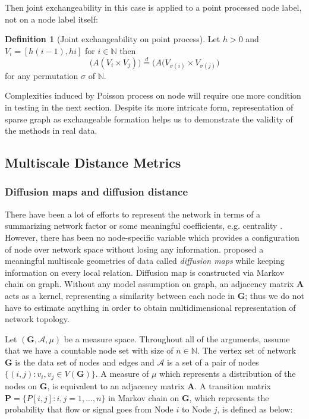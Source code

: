 \documentclass[12pt]{article}
\theoremstyle{definition}
\newtheorem{definition}{Definition}[section]
\begin{document}
Then joint exchangeability in this case is applied to a point processed node label, not on a node label itself:
\begin{definition}[Joint exchangeability on point process]
	\label{point}
	Let $h > 0$ and  $V_{i} = [h(i-1), hi ]$ for $i \in \mathbb{N}$ then
	\begin{equation}
	\big( A( V_{i} \times V_{j}  )   \big)  \stackrel{d}{=} \big( A( V_{\sigma(i)} \times V_{\sigma(j)}     \big)
	\end{equation}	
	for any permutation $\sigma$ of $\mathbb{N}$.		
\end{definition}
Complexities induced by Poisson process on node will require one more condition in testing in the next section. Despite its more intricate form, representation of sparse graph as exchangeable formation helps us to demonstrate the validity of the methods in real data.

\subsection{Multiscale Distance Metrics}	


\subsubsection{Diffusion maps and diffusion distance}	
There have been a lot of efforts to represent the network in terms of a summarizing network factor \citep{hoff2002latent} or some meaningful coefficients, e.g. centrality \citep{mantzaris2013dynamic, sporns2007identification}. However, there has been no node-specific variable which provides a configuration of node over network space without losing any information. \cite{coifman2006diffusion} proposed a meaningful multiscale geometries of data called \textit{diffusion maps} while keeping information on every local relation. Diffusion map is constructed via Markov chain on graph. Without any model assumption on graph, an adjacency matrix $\boldsymbol{A}$ acts as a kernel, representing a similarity between each node in $\boldsymbol{G}$; thus we do not have to estimate anything in order to obtain multidimensional representation of network topology. 
	
Let $(\boldsymbol{G}, \mathcal{A}, \mu)$ be a measure space. Throughout all of the arguments, assume that we have a countable node set with size of $n \in \mathbb{N}$. The vertex set of network $\boldsymbol{G}$ is the data set of nodes and edges and $\mathcal{A}$ is a set of a pair of nodes $\{(i,j) : v_{i}, v_{j} \in V(\boldsymbol{G}) \}$. A measure of $\mu$ which represents a distribution of the nodes on $\boldsymbol{G}$, is equivalent to an adjacency matrix $\boldsymbol{A}$. A transition matrix $\mathbf{P} = \{P[i,j] : i,j=1,...,n \}$ in Markov chain on $\boldsymbol{G}$, which represents the probability that flow or signal goes from Node $i$ to Node $j$, is defined as below:
	
\end{document}
